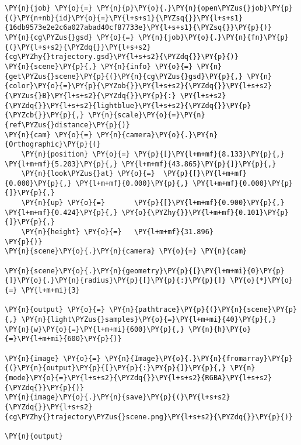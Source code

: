     \begin{tcolorbox}[breakable, size=fbox, boxrule=1pt, pad at break*=1mm,colback=cellbackground, colframe=cellborder]
\begin{Verbatim}[commandchars=\\\{\}]
\PY{n}{job} \PY{o}{=} \PY{n}{p}\PY{o}{.}\PY{n}{open\PYZus{}job}\PY{p}{(}\PY{n+nb}{id}\PY{o}{=}\PY{l+s+s1}{\PYZsq{}}\PY{l+s+s1}{16db9573e2e2c6a027abad40cf87733e}\PY{l+s+s1}{\PYZsq{}}\PY{p}{)}
\PY{n}{cg\PYZus{}gsd} \PY{o}{=} \PY{n}{job}\PY{o}{.}\PY{n}{fn}\PY{p}{(}\PY{l+s+s2}{\PYZdq{}}\PY{l+s+s2}{cg\PYZhy{}trajectory.gsd}\PY{l+s+s2}{\PYZdq{}}\PY{p}{)}
\PY{n}{scene}\PY{p}{,} \PY{n}{info} \PY{o}{=} \PY{n}{get\PYZus{}scene}\PY{p}{(}\PY{n}{cg\PYZus{}gsd}\PY{p}{,} \PY{n}{color}\PY{o}{=}\PY{p}{\PYZob{}}\PY{l+s+s2}{\PYZdq{}}\PY{l+s+s2}{\PYZus{}B}\PY{l+s+s2}{\PYZdq{}}\PY{p}{:} \PY{l+s+s2}{\PYZdq{}}\PY{l+s+s2}{lightblue}\PY{l+s+s2}{\PYZdq{}}\PY{p}{\PYZcb{}}\PY{p}{,} \PY{n}{scale}\PY{o}{=}\PY{n}{ref\PYZus{}distance}\PY{p}{)}
\PY{n}{cam} \PY{o}{=} \PY{n}{camera}\PY{o}{.}\PY{n}{Orthographic}\PY{p}{(}
    \PY{n}{position} \PY{o}{=} \PY{p}{[}\PY{l+m+mf}{8.133}\PY{p}{,} \PY{l+m+mf}{5.203}\PY{p}{,} \PY{l+m+mf}{43.865}\PY{p}{]}\PY{p}{,}
    \PY{n}{look\PYZus{}at} \PY{o}{=}  \PY{p}{[}\PY{l+m+mf}{0.000}\PY{p}{,} \PY{l+m+mf}{0.000}\PY{p}{,} \PY{l+m+mf}{0.000}\PY{p}{]}\PY{p}{,}
    \PY{n}{up} \PY{o}{=}       \PY{p}{[}\PY{l+m+mf}{0.900}\PY{p}{,} \PY{l+m+mf}{0.424}\PY{p}{,} \PY{o}{\PYZhy{}}\PY{l+m+mf}{0.101}\PY{p}{]}\PY{p}{,}
    \PY{n}{height} \PY{o}{=}   \PY{l+m+mf}{31.896}
\PY{p}{)}
\PY{n}{scene}\PY{o}{.}\PY{n}{camera} \PY{o}{=} \PY{n}{cam}

\PY{n}{scene}\PY{o}{.}\PY{n}{geometry}\PY{p}{[}\PY{l+m+mi}{0}\PY{p}{]}\PY{o}{.}\PY{n}{radius}\PY{p}{[}\PY{p}{:}\PY{p}{]} \PY{o}{*}\PY{o}{=} \PY{l+m+mi}{3}

\PY{n}{output} \PY{o}{=} \PY{n}{pathtrace}\PY{p}{(}\PY{n}{scene}\PY{p}{,} \PY{n}{light\PYZus{}samples}\PY{o}{=}\PY{l+m+mi}{40}\PY{p}{,} \PY{n}{w}\PY{o}{=}\PY{l+m+mi}{600}\PY{p}{,} \PY{n}{h}\PY{o}{=}\PY{l+m+mi}{600}\PY{p}{)}

\PY{n}{image} \PY{o}{=} \PY{n}{Image}\PY{o}{.}\PY{n}{fromarray}\PY{p}{(}\PY{n}{output}\PY{p}{[}\PY{p}{:}\PY{p}{]}\PY{p}{,} \PY{n}{mode}\PY{o}{=}\PY{l+s+s2}{\PYZdq{}}\PY{l+s+s2}{RGBA}\PY{l+s+s2}{\PYZdq{}}\PY{p}{)}
\PY{n}{image}\PY{o}{.}\PY{n}{save}\PY{p}{(}\PY{l+s+s2}{\PYZdq{}}\PY{l+s+s2}{cg\PYZhy{}trajectory\PYZus{}scene.png}\PY{l+s+s2}{\PYZdq{}}\PY{p}{)}

\PY{n}{output}
\end{Verbatim}
\end{tcolorbox}
 
